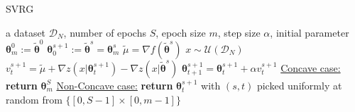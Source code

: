 \documentclass{article}
\theoremstyle{remark}
\theoremstyle{definition}
\newcommand{\vtheta}{\boldsymbol{\theta}}
\newcommand{\wt}[1]{\widetilde{#1}}
\begin{document}
\begin{algorithm}[tb]
	\caption{SVRG}
	\label{alg:svrg}
	\begin{algorithmic}
             a dataset $\mathcal{D}_N$, number of epochs $S$, epoch size $m$, step size $\alpha$, initial parameter $\vtheta_{m}^0:=\wt{\vtheta}^0$
        \STATE $\vtheta_0^{s+1} := \wt{\vtheta}^{s} = \vtheta_{m}^s$
        \STATE $\wt{\mu} = \nabla f(\wt{\vtheta}^s)$
        \STATE $x \sim \mathcal{U}\left(\mathcal{D}_N\right)$
		\STATE $v^{s+1}_t = 
			\wt{\mu} + 
			\nabla z(x|\vtheta_t^{s+1}) -
			\nabla z(x|\wt{\vtheta}^{s})
		$
        \STATE $\vtheta_{t+1}^{s+1} = \vtheta_t^{s+1} + \alpha v^{s+1}_t$
		\ENDFOR
		\ENDFOR
        \STATE \underline{Concave case:} \textbf{return} $\vtheta_{m}^S$
        \STATE \underline{Non-Concave case:} \textbf{return} $\vtheta_t^{s+1}$ with $(s,t)$ picked uniformly at random from $\{[0,S-1]\times[0,m-1]\}$
	\end{algorithmic}
\end{algorithm}

\vspace{-0.05in}
\end{document}
